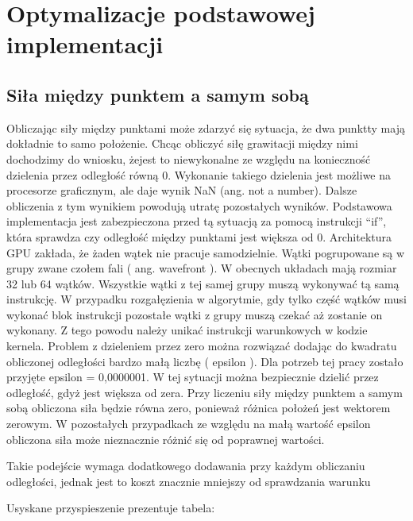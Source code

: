 
\section { Optymalizacje podstawowej implementacji }


\subsection { Siła między punktem a samym sobą }
Obliczając siły między punktami może zdarzyć się sytuacja, że dwa punktty mają dokładnie to samo położenie. Chcąc obliczyć siłę grawitacji między nimi dochodzimy do wniosku, żejest to niewykonalne ze względu na konieczność dzielenia przez odległość równą 0. Wykonanie takiego dzielenia jest możliwe na procesorze graficznym, ale daje wynik NaN (ang. not a number). Dalsze obliczenia z tym wynikiem powodują utratę pozostałych wyników. Podstawowa implementacja jest zabezpieczona przed tą sytuacją za pomocą instrukcji ``if'', która sprawdza czy odległość między punktami jest większa od 0.\linebreak
Architektura GPU zakłada, że żaden wątek nie pracuje samodzielnie. Wątki pogrupowane są w grupy zwane czołem fali ( ang. wavefront ). W obecnych układach mają rozmiar 32 lub 64 wątków. Wszystkie wątki z tej samej grupy muszą wykonywać tą samą instrukcję. W przypadku rozgałęzienia w algorytmie, gdy tylko część wątków musi wykonać blok instrukcji pozostałe wątki z grupy muszą czekać aż zostanie on wykonany. Z tego powodu należy unikać instrukcji warunkowych w kodzie kernela.\linebreak
Problem z dzieleniem przez zero można rozwiązać dodając do kwadratu obliczonej odległości bardzo małą liczbę ( epsilon ). Dla potrzeb tej pracy zostało przyjęte epsilon = 0,0000001. W tej sytuacji można bezpiecznie dzielić przez odległość, gdyż jest większa od zera. Przy liczeniu siły między punktem a samym sobą obliczona siła będzie równa zero, ponieważ różnica położeń jest wektorem zerowym. W pozostałych przypadkach ze względu na małą wartość epsilon obliczona siła może nieznacznie różnić się od poprawnej wartości.

Takie podejście wymaga dodatkowego dodawania przy każdym obliczaniu odległości, jednak jest to koszt znacznie mniejszy od sprawdzania warunku

Usyskane przyspieszenie prezentuje tabela:
\linebreak

